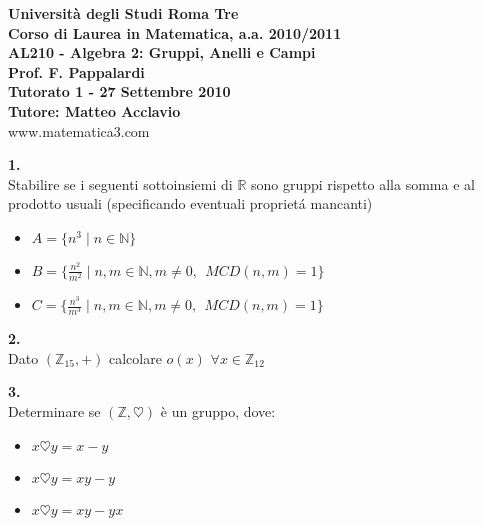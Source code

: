 \documentclass[italian,a4paper,11pt]
{article}
\newcommand{\Z}{\mathbb Z}
\newcommand{\R}{\mathbb{R}}
\newcommand{\N}{\mathbb{N}}
\newcommand{\acc}{\`}
\begin{document}
\begin{center}

\textbf{Universit\`a degli Studi Roma Tre}\\

\textbf{Corso di Laurea in Matematica, a.a. 2010/2011}\\

\textbf{AL210 - Algebra 2: Gruppi, Anelli e Campi}\\

\textbf{Prof. F. Pappalardi}\\

\textbf{Tutorato 1 - 27 Settembre 2010}\\

\textbf{Tutore: Matteo Acclavio}\\

www.matematica3.com\\
\end{center}



\vspace{0.4cm}

\noindent
\begin{Ex}\textbf{ 1.}\\
Stabilire se i seguenti sottoinsiemi di $\R$ sono gruppi rispetto alla somma e al prodotto usuali (specificando eventuali propriet\'a mancanti)
\begin{itemize}
\item $A=\{n^3 \mid n\in \N\}$
\item $B=\{\frac{n^2}{m^2}\mid n,m\in \N ,m\neq 0,\ \ MCD(n,m)=1\}$
\item $C=\{\frac{n^3}{m^3}\mid n,m\in \N,m\neq 0 ,\  \ MCD(n,m)=1\}$
\end{itemize}
\end{Ex}
\vspace{0.4cm}

\noindent
\begin{Ex}\textbf{ 2.}\\
Dato $(\Z_{15}, +)$ calcolare $o(x)$  $\forall x \in \Z_{12}$
\end{Ex}

\vspace{0.4cm}
\noindent
\begin{Ex}\textbf{ 3.}\\
Determinare se $(\Z, \heartsuit)$ \acc e un gruppo, dove:
\begin{itemize}
\item $x\heartsuit y= x-y$
\item $x\heartsuit y= xy-y$
\item $x\heartsuit y= xy-yx$
\end{itemize}
\end{Ex}
\end{document}
